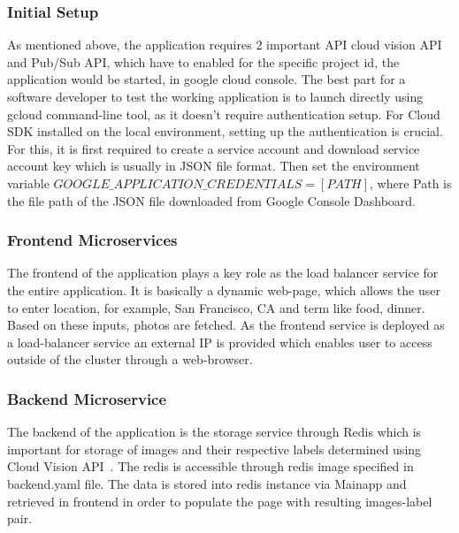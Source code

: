 \subsubsection{Initial Setup} As mentioned above, the application
requires 2 important API cloud vision API and Pub/Sub API, which have
to enabled for the specific project id, the application would be
started, in google cloud console. The best part for a software
developer to test the working application is to launch directly using
gcloud command-line tool, as it doesn’t require authentication setup.
For Cloud SDK installed on the local environment, setting up the
authentication is crucial. For this, it is first required to create a
service account and download service account key which is usually in
JSON file format. Then set the environment variable
\(GOOGLE\_APPLICATION\_CREDENTIALS = [PATH]\), where Path is the
file path of the JSON file downloaded from Google Console Dashboard.

\subsubsection{Frontend Microservices} The frontend of the application
  plays a key role as the load balancer service for the entire
  application. It is basically a dynamic web-page, which allows the
  user to enter location, for example, San Francisco, CA and term
  like food, dinner. Based on these inputs, photos are fetched. As
  the frontend service is deployed as a load-balancer service an
  external IP is provided which enables user to access outside of the
  cluster through a web-browser.

\subsubsection{Backend Microservice} The backend of the application is
  the storage service through Redis which is important for storage of
  images and their respective labels determined using Cloud Vision
  API~\cite{hid-sp18-602-redis}. The redis is accessible through redis
  image specified in backend.yaml file. The data is stored into redis
  instance via Mainapp and retrieved in frontend in order to populate
  the page with resulting images-label pair.

